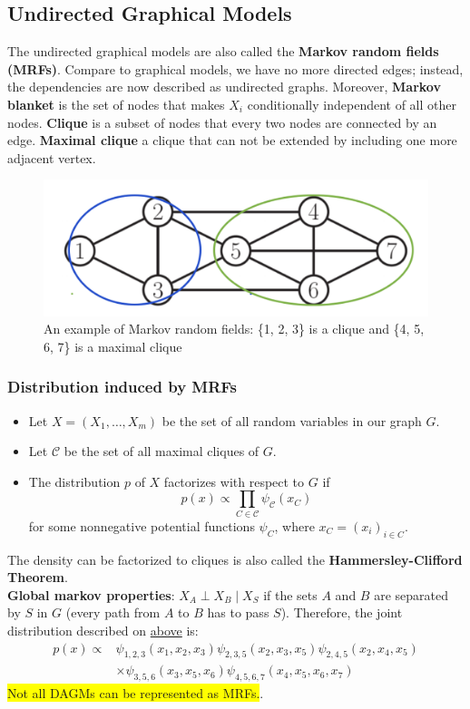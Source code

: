 \subsection{Undirected Graphical Models}
The undirected graphical models are also called the \textbf{Markov random fields (MRFs)}. Compare to graphical models, we have no more directed edges; instead, the dependencies are now described as undirected graphs. Moreover, \textbf{Markov blanket} is the set of nodes that makes $X_i$ conditionally independent of all other nodes. \textbf{Clique} is a subset of nodes that every two nodes are connected by an edge. \textbf{Maximal clique} a clique that can not be extended by including one more adjacent vertex.
\begin{figure}[H]
    \centering
    \includegraphics[width = .7\linewidth]{figures/section2/figure_2_6.png}
    \caption{An example of Markov random fields: \{1, 2, 3\} is a clique and \{4, 5, 6, 7\} is a maximal clique}
    \label{fig:mrf}
\end{figure}
\subsubsection*{Distribution induced by MRFs}
\begin{itemize}
    \item Let $X=\left(X_1, \ldots, X_m\right)$ be the set of all random variables in our graph $G$.
    \item Let $\mathcal{C}$ be the set of all maximal cliques of $G$.
    \item The distribution $p$ of $X$ factorizes with respect to $G$ if
$$
p(x) \propto \prod_{C \in \mathcal{C}} \psi_{\mathcal{C}}\left(x_C\right)
$$
for some nonnegative potential functions $\psi_C$, where $x_C=\left(x_i\right)_{i \in C}$.
\end{itemize}
The density can be factorized to cliques is also called the \textbf{Hammersley-Clifford Theorem}.\\
\textbf{Global markov properties}: $X_A\perp X_B\mid X_S$ if the sets $A$ and $B$ are separated by $S$ in $G$ (every path from $A$ to $B$ has to pass $S$).
Therefore, the joint distribution described on \hyperlink{fig:mrf}{above} is: 
\begin{align*}
  p(x) \propto & \psi_{1,2,3}\left(x_1, x_2, x_3\right) \psi_{2,3,5}\left(x_2, x_3, x_5\right) \psi_{2,4,5}\left(x_2, x_4, x_5\right) \\
  & \times \psi_{3,5,6}\left(x_3, x_5, x_6\right) \psi_{4,5,6,7}\left(x_4, x_5, x_6, x_7\right)
  \end{align*}
\colorbox{yellow}{Not all DAGMs can be represented as MRFs.}.\\

